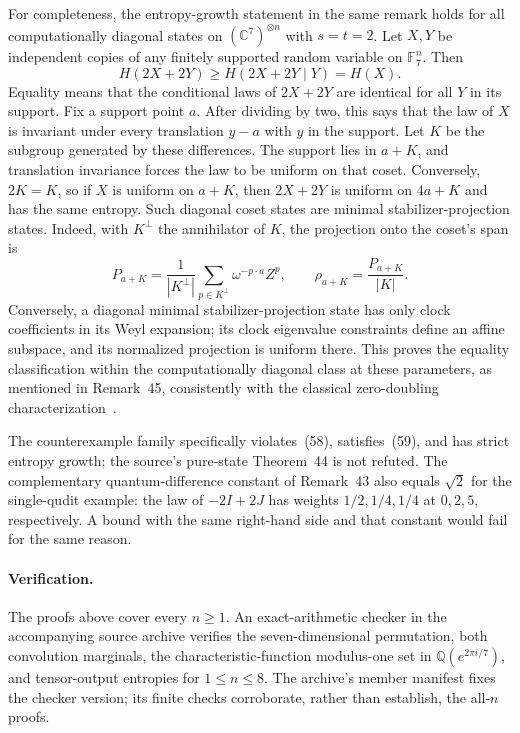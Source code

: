 \documentclass[10pt]{article}
\begin{document}
For completeness, the entropy-growth statement in the same remark holds for all
computationally diagonal states on $(\mathbb C^7)^{\otimes n}$ with $s=t=2$.
Let $X,Y$ be independent copies of any finitely
supported random variable on $\mathbb F_7^n$. Then
\[
 H(2X+2Y)\ge H(2X+2Y\mid Y)=H(X).
\]
Equality means that the conditional laws of $2X+2Y$ are identical for all
$Y$ in its support. Fix a support point $a$. After dividing by two, this says
that the law of $X$ is invariant under every translation $y-a$ with $y$ in
the support. Let $K$ be the subgroup generated by these differences.
The support lies in $a+K$, and translation invariance forces the law to be
uniform on that coset. Conversely, $2K=K$, so if $X$ is uniform on $a+K$, then $2X+2Y$
is uniform on $4a+K$ and has the same entropy. Such diagonal coset states are
minimal stabilizer-projection states. Indeed, with $K^\perp$ the annihilator of
$K$, the projection onto the coset's span is
\[
 P_{a+K}=\frac1{|K^\perp|}\sum_{p\in K^\perp}\omega^{-p\cdot a}Z^p,
 \qquad \rho_{a+K}=\frac{P_{a+K}}{|K|}.
\]
Conversely, a diagonal minimal stabilizer-projection state has only clock
coefficients in its Weyl expansion; its clock eigenvalue constraints define an
affine subspace, and its normalized projection is uniform there.
This proves the equality classification within the computationally diagonal
class at these parameters, as mentioned in Remark~45, consistently
with the classical zero-doubling characterization~\cite[Theorem~1.11(i), \S5]{Tao}.

The counterexample family specifically violates~(58), satisfies~(59), and has
strict entropy growth; the source's pure-state Theorem~44 is not refuted.
The complementary quantum-difference constant of Remark~43 also
equals $\sqrt2$ for the single-qudit example: the law of $-2I+2J$ has weights
$1/2,1/4,1/4$ at $0,2,5$, respectively. A bound with the same right-hand side
and that constant would fail for the same reason.

\paragraph{Verification.}
The proofs above cover every $n\ge1$. An exact-arithmetic checker in the
accompanying source archive verifies the seven-dimensional permutation, both
convolution marginals, the characteristic-function modulus-one set in
$\mathbb Q(e^{2\pi i/7})$, and tensor-output entropies for $1\le n\le8$.
The archive's member manifest fixes the checker version; its finite checks
corroborate, rather than establish, the all-$n$ proofs.
\end{document}
